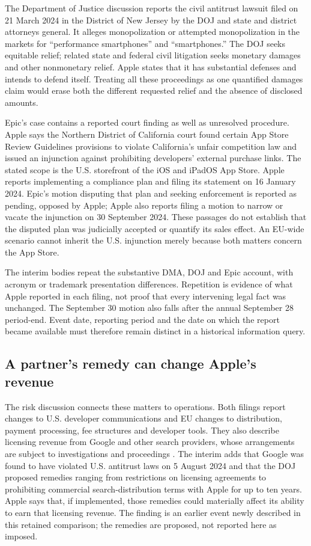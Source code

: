 The Department of Justice discussion reports the civil antitrust lawsuit
filed on 21 March 2024 in the District of New Jersey by the DOJ and state and
district attorneys general. It alleges monopolization or attempted
monopolization in the markets for ``performance smartphones'' and
``smartphones.'' The DOJ seeks equitable relief; related state and federal
civil litigation seeks monetary damages and other nonmonetary relief. Apple
states that it has substantial defenses and intends to defend itself.
Treating all these proceedings as one quantified damages claim would erase
both the different requested relief and the absence of disclosed amounts.

Epic's case contains a reported court finding as well as unresolved procedure.
Apple says the Northern District of California court found certain App Store
Review Guidelines provisions to violate California's unfair competition law
and issued an injunction against prohibiting developers' external purchase
links. The stated scope is the U.S. storefront of the iOS and iPadOS App Store.
Apple reports implementing a compliance plan and filing its statement on
16 January 2024. Epic's motion disputing that plan and seeking enforcement is
reported as pending, opposed by Apple; Apple also reports filing a motion to
narrow or vacate the injunction on 30 September 2024. These passages do not
establish that the disputed plan was judicially accepted or quantify its sales
effect. An EU-wide scenario cannot inherit the U.S. injunction merely because
both matters concern the App Store.

The interim bodies repeat the substantive DMA, DOJ and Epic account, with
acronym or trademark presentation differences. Repetition is evidence of what
Apple reported in each filing, not proof that every intervening legal fact was
unchanged. The September 30 motion also falls after the annual September 28
period-end. Event date, reporting period and the date on which the report
became available must therefore remain distinct in a historical information
query.

\subsection{A partner's remedy can change Apple's revenue}

The risk discussion connects these matters to operations. Both filings report
changes to U.S. developer communications and EU changes to distribution,
payment processing, fee structures and developer tools. They also describe
licensing revenue from Google and other search providers, whose arrangements
are subject to investigations and proceedings
\citep[Risk Factors, printed pp.~14--15]{apple2024}
\citep[Part II, Item 1A, printed pp.~19--20]{apple2025q1}.
The interim adds that Google was found to have violated U.S. antitrust laws on
5 August 2024 and that the DOJ proposed remedies ranging from restrictions on
licensing agreements to prohibiting commercial search-distribution terms with
Apple for up to ten years. Apple says that, if implemented, those remedies
could materially affect its ability to earn that licensing revenue. The
finding is an earlier event newly described in this retained comparison;
the remedies are proposed, not reported here as imposed.

